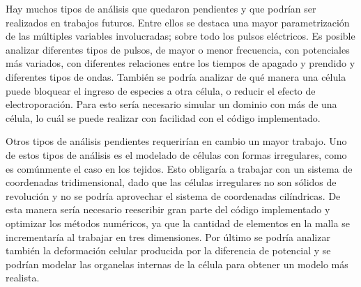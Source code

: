 Hay muchos tipos de análisis que quedaron pendientes y que podrían ser realizados en trabajos futuros. Entre ellos se destaca una mayor parametrización de las múltiples variables involucradas; sobre todo los pulsos eléctricos. Es posible analizar diferentes tipos de pulsos, de mayor o menor frecuencia, con potenciales más variados, con diferentes relaciones entre los tiempos de apagado y prendido y diferentes tipos de ondas. También se podría analizar de qué manera una célula puede bloquear el ingreso de especies a otra célula, o reducir el efecto de electroporación. Para esto sería necesario simular un dominio con más de una célula, lo cuál se puede realizar con facilidad con el código implementado. 

Otros tipos de análisis pendientes requerirían en cambio un mayor trabajo. Uno de estos tipos de análisis es el modelado de células con formas irregulares, como es comúnmente el caso en los tejidos. Esto obligaría a trabajar con un sistema de coordenadas tridimensional, dado que las células irregulares no son sólidos de revolución y no se podría aprovechar el sistema de coordenadas cilíndricas. De esta manera sería necesario reescribir gran parte del código implementado y optimizar los métodos numéricos, ya que la cantidad de elementos en la malla se incrementaría al trabajar en tres dimensiones. Por último se podría analizar también la deformación celular producida por la diferencia de potencial y se podrían modelar las organelas internas de la célula para obtener un modelo más realista.

